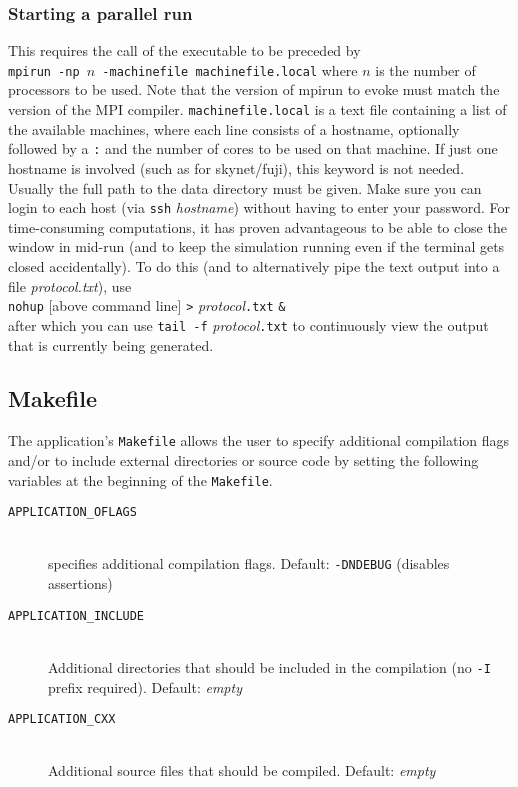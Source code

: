 \subsubsection{Starting a parallel run}
\label{sect:run_par}

This requires the call of the executable to be preceded by\\
{\tt mpirun -np $n$ -machinefile machinefile.local}
where $n$ is the number of processors to be used.
Note that the version of mpirun to evoke must match the version of
the MPI compiler. %
{\tt machinefile.local} is a text file containing a list of the available
machines, where each line consists of a hostname, optionally followed
by a {\tt :} and the number of cores to be used on that machine. If just one
hostname is involved (such as for {\sc skynet}/{\sc fuji}), this keyword
is not needed.
Usually the full path to the data directory must be given. Make
sure you can login to each host (via {\tt ssh} {\it hostname}) without
having to enter your password.
For time-consuming computations, it has proven advantageous to be able to
close the window in mid-run (and to keep the simulation running even if
the terminal gets closed accidentally). To do this (and to alternatively pipe
the text output into a file {\it protocol.txt}), use \\
{\tt nohup} [above command line] \verb+>+ {\it protocol}{\tt .txt} \verb+&+ \\
after which you can use {\tt tail -f} {\it protocol}{\tt .txt} to continuously
view the output that is currently being generated.

\subsection{Makefile}
\label{sect:makefile}
The application's {\tt Makefile} allows the user to specify additional
compilation flags and/or to include external directories or source code
by setting the following variables at the beginning of the {\tt Makefile}.

\begin{description}
\item[{\tt APPLICATION\_OFLAGS}]{\ }\\
  specifies additional compilation flags. Default: {\tt -DNDEBUG} (disables assertions)
  
\item[{\tt APPLICATION\_INCLUDE}]{\ }\\
  Additional directories that should be included in the compilation (no {\tt -I} prefix required). Default: {\it empty}
  
\item[{\tt APPLICATION\_CXX}]{\ }\\
  Additional source files that should be compiled. Default: {\it empty}

\end{description}
